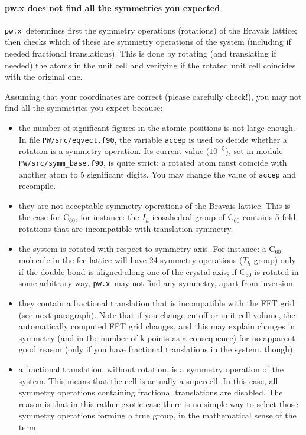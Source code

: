 \documentclass[12pt,a4paper]{article}
\def\pwx{\texttt{pw.x}}
\begin{document}
\paragraph{pw.x does not find all the symmetries you expected} 
\pwx\ determines first the symmetry operations (rotations) of the
Bravais lattice; then checks which of these are symmetry operations of
the system (including if needed fractional translations). This is done
by rotating (and translating if needed) the atoms in the unit cell and
verifying if the rotated unit cell coincides with the original one.

Assuming that your coordinates are correct (please carefully check!),
you may not find all the symmetries you expect because:
\begin{itemize}
\item the number of significant figures in the atomic positions is not
  large enough. In file \texttt{PW/src/eqvect.f90}, the variable \texttt{accep} is used to
  decide whether a rotation is a symmetry operation. Its current value
  ($10^{-5}$), set in module \texttt{PW/src/symm\_base.f90}, 
  is quite strict: a rotated atom must coincide with
  another atom to 5 significant digits. You may change the value of
  \texttt{accep} and recompile. 
\item they are not acceptable symmetry operations of the Bravais
  lattice. This is the case for C$_{60}$, for instance: the $I_h$
  icosahedral group of C$_{60}$ contains 5-fold rotations that are
  incompatible with translation symmetry.  
\item  the system is rotated with respect to symmetry axis. For
  instance: a C$_{60}$ molecule in the fcc lattice will have 24
  symmetry operations ($T_h$ group) only if the double bond is
  aligned along one of the crystal axis; if C$_{60}$ is rotated
  in some arbitrary way, \pwx\ may not find any symmetry, apart from
  inversion. 
\item they contain a fractional translation that is incompatible with
  the FFT grid (see next paragraph). Note that if you change cutoff or
  unit cell volume, the automatically computed FFT grid changes, and
  this may explain changes in symmetry (and in the number of k-points
  as a consequence) for no apparent good reason (only if you have
  fractional translations in the system, though). 
\item a fractional translation, without rotation, is a symmetry
  operation of the system. This means that the cell is actually a
  supercell. In this case, all symmetry operations containing
  fractional translations are disabled. The reason is that in this
  rather exotic case there is no simple way to select those symmetry
  operations forming a true group, in the mathematical sense of the
  term. 
\end{itemize}
\end{document}
